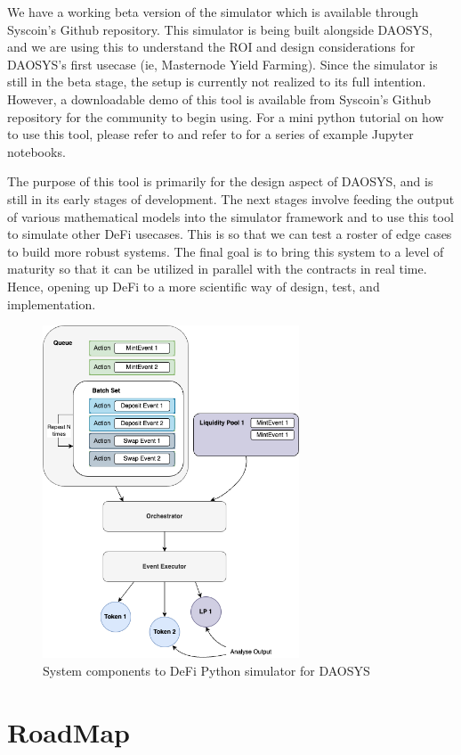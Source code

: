\documentclass[journal,twocolumn,12pt]{ieeesyscoin}
\begin{document}
We have a working beta version of the simulator which is available through Syscoin’s Github repository. This simulator is being built alongside DAOSYS, and we are using this to understand the ROI and design considerations for DAOSYS’s first usecase (ie, Masternode Yield Farming). Since the simulator is still in the beta stage, the setup is currently not realized to its full intention. However, a downloadable demo of this tool is available from Syscoin's Github repository for the community to begin using. For a mini python tutorial on how to use this tool, please refer to \cite{Moo22B} and refer to \cite{DAOSim22} for a series of example Jupyter notebooks.

The purpose of this tool is primarily for the design aspect of DAOSYS, and is still in its early stages of development. The next stages involve feeding the output of various mathematical models into the simulator framework and to use this tool to simulate other DeFi usecases. This is so that we can test a roster of edge cases to build more robust systems. The final goal is to bring this system to a level of maturity so that it can be utilized in parallel with the contracts in real time. Hence, opening up DeFi to a more scientific way of design, test, and implementation.

\begin{figure}[h!]
\includegraphics[width=3in]{img/simulator.png}
\caption{System components to DeFi Python simulator for DAOSYS} 
\label{fig:simulator}
\end{figure} 

\section{RoadMap}
\label{sec:roadmap}
\end{document}
